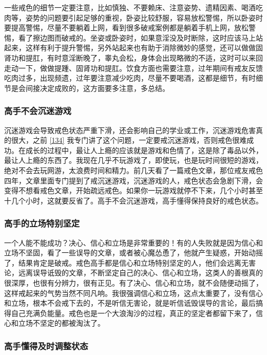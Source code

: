 一些戒色的细节一定要注意，比如慎独、不要赖床、注意姿势、遗精因素、喝酒吃肉等，姿势的问题要引起足够的重视，卧姿比较舒服，容易放松警惕，所以卧姿时要提高警惕，尽量不要躺着上网，看到很多破戒案例都是躺着手机上网，放松警惕，看了擦边图而破戒的。坐姿或卧姿时，如果意淫没及时断除，这时应该马上站起来，这样有利于提升警惕，另外站起来也有助于消除微妙的感觉，还可以做做固肾功和提肛，有时意淫断晚了，睾丸会松，身体会出现略微的不适，这时可以来回走动一下，做做提踵、固肾功和提肛。饮食方面也需要注意，过年期间有戒友反馈吃肉过多，出现频遗，过年要注意减少吃肉，尽量不要喝酒，这都是细节，有时细节是会间接决定成败的，这方面要多注意，多总结。

\subsubsection{高手不会沉迷游戏}

沉迷游戏会导致戒色状态严重下滑，还会影响自己的学业或工作，沉迷游戏危害真的很大，之前 \ref{134} 我专门讲了这个问题，一定要戒沉迷游戏，否则戒色很难成功。在成长的过程中，最让人上瘾的应该就是游戏和色情了，这是除了毒品以外，最让人上瘾的东西了。我现在几乎不玩游戏了，即使玩，也是玩时间很短的游戏，绝对不会去玩网游，太浪费时间和精力。前几天看了一篇戒色文章，那位戒友戒色四年，文章里面专门提到了戒沉迷游戏，沉迷游戏的人，戒色状态会急剧下滑，会变得不想看戒色文章，开始疏远戒色。如果你一玩游戏就停不下来，几个小时甚至十几个小时，这就要反省了。高手不会沉迷游戏，高手懂得保持良好的戒色状态。

\subsubsection{高手的立场特别坚定}

一个人能不能成功？决心、信心和立场是非常重要的！有的人失败就是因为信心和立场不坚固，看了一些误导的文章，或者被心魔怂恿了，他就产生疑惑，开始动摇了，结果肯定是破戒。戒色高手都是信心和立场特别坚定的人，他们会远离无害论，远离误导诋毁的文章，不断坚定自己的决心、信心和立场，这类人的善根真的很深厚，也很有分辨力，很有正见。有了决心、信心和立场，就不会随便动摇了，这样戒起来的气势当然不同凡响。我很强调信心和立场，这点太重要了，没有信心和立场，根本不会戒下去的，不是听信无害论，就是听信诋毁误导的言论，最后搞得自己充满负能量。戒色也是一个大浪淘沙的过程，真正的坚定者都留下来了，信心和立场不坚定的都被淘汰了。

\subsubsection{高手懂得及时调整状态}

